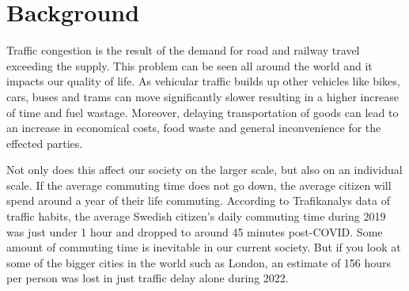 


\section{Background}
    Traffic congestion is the result of the demand for road and railway travel exceeding the supply. This problem can be seen all around the world\cite{inrix} and it impacts our quality of life. As vehicular traffic builds up other vehicles like bikes, cars, buses and trams can move significantly slower resulting in a higher increase of time and fuel wastage. Moreover, delaying transportation of goods can lead to an increase in economical costs, food waste and general inconvenience for the effected parties.

    Not only does this affect our society on the larger scale, but also on an individual scale. If the average commuting time does not go down, the average citizen will spend around a year of their life commuting. According to Trafikanalys data of traffic habits\cite{trafikanalys_2022}, the average Swedish citizen's daily commuting time during 2019 was just under 1 hour and dropped to around 45 minutes post-COVID. Some amount of commuting time is inevitable in our current society. But if you look at some of the bigger cities in the world such as London, an estimate of 156 hours per person was lost in just traffic delay alone during 2022\cite{inrix}.

